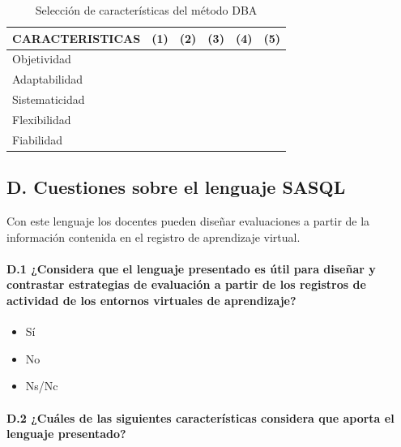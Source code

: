 \begin{table}[H]
  \begin{center}
  \begin{tabular}{| m{5cm} | c | c | c | c | c |}
    \hline
    CARACTERISTICAS & (1) & (2) & (3) & (4) & (5) \\
    \hline
    \hline
    Objetividad &  &  & & & \\
    \hline
    Adaptabilidad &  &  & & & \\
    \hline
    Sistematicidad &  &  & & &  \\
    \hline
    Flexibilidad &  &  & & &  \\
    \hline
    Fiabilidad &  &  & & &  \\
    \hline
  \end{tabular}
\end{center}
\caption{Selección de características del método DBA}
\label{tab:ap:caracteristicas:metodo}
\end{table}

\newpage

\subsection*{D. Cuestiones sobre el lenguaje SASQL}

\begin{mdframed}[style=cuestionarioST]
	Con este lenguaje los docentes pueden diseñar evaluaciones a partir de la información contenida en el registro de aprendizaje virtual. 
\end{mdframed}

	\paragraph*{D.1 ¿Considera que el lenguaje presentado es útil para diseñar y contrastar estrategias de evaluación a partir de los registros de actividad de los entornos virtuales de aprendizaje?}

\begin{mdframed}[style=cuestionarioST]
			\begin{itemize}
				\item Sí
				\item No
				\item Ns/Nc
			\end{itemize}
\end{mdframed}


	\paragraph*{D.2 ¿Cuáles de las siguientes características considera que aporta el lenguaje presentado?}

